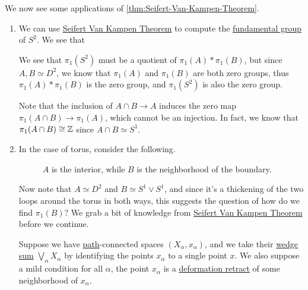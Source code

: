 \begin{eg}
	We now see some applications of \autoref{thm:Seifert-Van-Kampen-Theorem}.
	\begin{enumerate}
		\item We can use \hyperref[thm:Seifert-Van-Kampen-Theorem]{Seifert Van Kampen Theorem} to compute the \hyperref[def:fundamental-group]{fundamental group}
		      of \(S^{2}\). We see that
		      \begin{figure}[H]
			      \centering
			      \label{fig:lec11-eg:2-sphere}
		      \end{figure}
		      We see that \(\pi _1(S^{2} )\) must be a quotient of \(\pi _1(A)\ast \pi _1(B)\), but since \(A, B\simeq D^{2} \), we know that
		      \(\pi _1(A)\) and \(\pi _1(B)\) are both zero groups, thus \(\pi _1(A)\ast \pi _1(B)\) is the zero group, and \(\pi _1(S^{2} )\) is
		      also the zero group.
		      \begin{remark}
			      Note that the inclusion of \(A\cap B\to A\) induces the zero map \(\pi _1(A\cap B)\to \pi _1(A)\), which cannot be an injection.
			      In fact, we know that \(\pi _1(A\cap B)\cong \mathbb{\MakeUppercase{z}} \) since \(A\cap B\simeq S^1\).
		      \end{remark}
		\item \label{lec11:eg:torus} In the case of torus, consider the following.
		      \begin{figure}[H]
			      \centering
			      \caption{\(A\) is the interior, while \(B\) is the neighborhood of the boundary.}
			      \label{fig:lec11-eg2:torus}
		      \end{figure}
		      Now note that \(A\simeq D^{2} \) and \(B\simeq S^1\vee S^1\), and since it's a thickening of the two loops around the torus in
		      both ways, this suggests the question of how do we find \(\pi _1(B)\)? We grab a bit of knowledge from \hyperref[thm:Seifert-Van-Kampen-Theorem]{Seifert Van Kampen Theorem}
		      before we continue.

		      \hr

		      \begin{exercise}
			      Suppose we have \hyperref[def:path]{path}-connected spaces \((X_\alpha , x_\alpha )\), and we take their \hyperref[sssec-Wedge-sum]{wedge sum} \(\bigvee_\alpha X_\alpha \) by
			      identifying the points \(x_\alpha \) to a single point \(x\). We also suppose a mild condition for all \(\alpha\), the point
			      \(x_\alpha \) is a \hyperref[def:deformation-retraction]{deformation retract} of some neighborhood of \(x_\alpha \).


\end{exercise}
\end{enumerate}
\end{eg}
